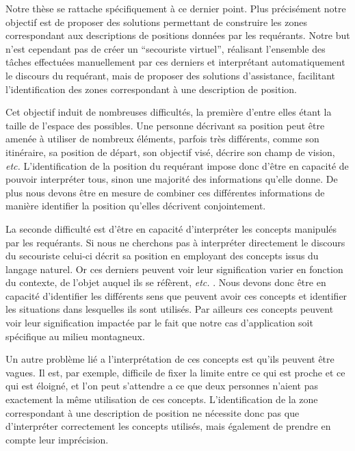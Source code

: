 Notre thèse se rattache spécifiquement à ce dernier point. Plus
précisément notre objectif est de proposer des solutions permettant de
construire les zones correspondant aux descriptions de positions
données par les requérants. Notre but n'est cependant pas de créer un
\enquote{secouriste virtuel}, réalisant l'ensemble des tâches
effectuées manuellement par ces derniers et interprétant
automatiquement le discours du requérant, mais de proposer des
solutions d'assistance, facilitant l'identification des zones
correspondant à une description de position.

Cet objectif induit de nombreuses difficultés, la première d'entre
elles étant la taille de l'espace des possibles. Une personne
décrivant sa position peut être amenée à utiliser de nombreux
éléments, parfois très différents, comme son itinéraire, sa position
de départ, son objectif visé, décrire son champ de vision, \emph{etc.}
L'identification de la position du requérant impose donc d'être en
capacité de pouvoir interpréter tous, sinon une majorité des
informations qu'elle donne. De plus nous devons être en mesure de
combiner ces différentes informations de manière identifier la
position qu'elles décrivent conjointement.

La seconde difficulté est d'être en capacité d'interpréter les
concepts manipulés par les requérants. Si nous ne cherchons pas à
interpréter directement le discours du secouriste celui-ci décrit sa
position en employant des concepts issus du langage naturel. Or ces
derniers peuvent voir leur signification varier en fonction du
contexte, de l'objet auquel ils se réfèrent, \emph{etc.}
\autocite{Vandeloise1986}. Nous devons donc être en capacité
d'identifier les différents sens que peuvent avoir ces concepts et
identifier les situations dans lesquelles ils sont utilisés. Par
ailleurs ces concepts peuvent voir leur signification impactée par le
fait que notre cas d’application soit spécifique au milieu montagneux.

Un autre problème lié a l'interprétation de ces concepts est qu'ils
peuvent être vagues.  Il est, par exemple, difficile de fixer la
limite entre ce qui est proche et ce qui est éloigné, et l'on peut
s'attendre a ce que deux personnes n'aient pas exactement la même
utilisation de ces concepts. L’identification de la zone correspondant
à une description de position ne nécessite donc pas que d'interpréter
correctement les concepts utilisés, mais également de prendre en
compte leur imprécision.

